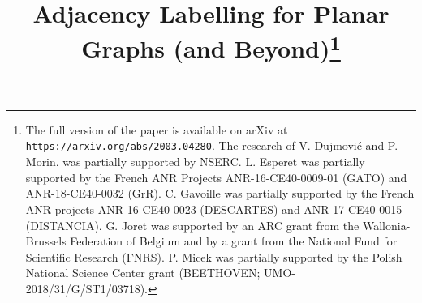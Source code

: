 \documentclass[10pt, conference, compsocconf]{IEEEtran}
\begin{document}
\title{Adjacency Labelling for Planar Graphs (and Beyond)\thanks{The full version of the paper is available on arXiv at {\tt https://arxiv.org/abs/2003.04280}. The research of V. Dujmović and P. Morin. was partially supported by NSERC. L. Esperet was partially supported by the French ANR Projects ANR-16-CE40-0009-01 (GATO) and ANR-18-CE40-0032 (GrR). C. Gavoille was partially supported by the French ANR projects ANR-16-CE40-0023 (DESCARTES) and ANR-17-CE40-0015 (DISTANCIA). G. Joret was supported by an ARC grant from the Wallonia-Brussels Federation of Belgium and by a grant from the National Fund for Scientific Research (FNRS). P. Micek was partially supported by the Polish National Science Center grant (BEETHOVEN; UMO-2018/31/G/ST1/03718).}}
\author{
\and
{}
\and
{}
\and
{}
\and
{}
\and
{}

}
\end{document}
